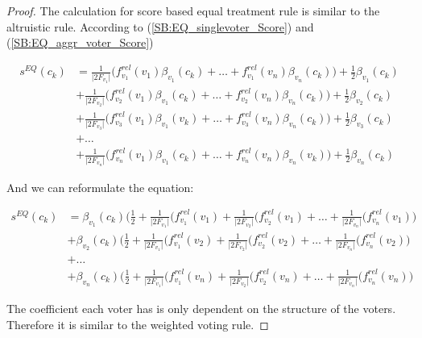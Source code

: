 \documentclass{article}
\begin{document}
\begin{proof}
    
The calculation for score based equal treatment rule is similar to the altruistic rule. According to   (\ref{SB:EQ_singlevoter_Score}) and    (\ref{SB:EQ_aggr_voter_Score})

\begin{equation*}
\begin{split}
s^{EQ}(c_k) &= \frac{1}{\vert 2F_{v_1}\vert}\big(f_{v_1}^{rel}(v_1)\beta_{v_1}(c_k) + \dots + f_{v_1}^{rel}(v_n)\beta_{v_n}(c_k)\big) + \frac{1}{2}\beta_{v_1}(c_k)\\
            &+ \frac{1}{\vert 2F_{v_2}\vert}\big(f_{v_2}^{rel}(v_1)\beta_{v_1}(c_k) + \dots + f_{v_2}^{rel}(v_n)\beta_{v_n}(c_k)\big) + \frac{1}{2}\beta_{v_2}(c_k) \\
            &+ \frac{1}{\vert 2F_{v_3}\vert}\big(f_{v_3}^{rel}(v_1)\beta_{v_1}(v_k) + \dots + f_{v_3}^{rel}(v_n)\beta_{v_n}(c_k)\big) + \frac{1}{2}\beta_{v_3}(c_k) \\
            &+ \dots \\ 
            &+ \frac{1}{\vert 2F_{v_n}\vert}\big(f_{v_n}^{rel}(v_1)\beta_{v_1}(c_k) + \dots + f_{v_n}^{rel}(v_n)\beta_{v_n}(v_k)\big) +    \frac{1}{2}\beta_{v_n}(c_k)
\end{split}
\end{equation*}

And we can reformulate the equation:

\begin{equation*}
\begin{split}
s^{EQ}(c_k) &= \beta_{v_1}(c_k)\big(\frac{1}{2}+\frac{1}{\vert 2F_{v_1}\vert}(f_{v_1}^{rel}(v_1) +  \frac{1}{\vert 2F_{v_2}\vert}(f_{v_2}^{rel}(v_1)+ \dots +\frac{1}{\vert 2F_{v_n}\vert}(f_{v_n}^{rel}(v_1)\big) \\
            &+ \beta_{v_2}(c_k)\big(\frac{1}{2}+\frac{1}{\vert 2F_{v_1}\vert}(f_{v_1}^{rel}(v_2) +  \frac{1}{\vert 2F_{v_2}\vert}(f_{v_2}^{rel}(v_2)+ \dots +\frac{1}{\vert 2F_{v_n}\vert}(f_{v_n}^{rel}(v_2)\big) \\
            &+  \dots  \\
            &+ \beta_{v_n}(c_k)\big(\frac{1}{2}+\frac{1}{\vert 2F_{v_1}\vert}(f_{v_1}^{rel}(v_n) +  \frac{1}{\vert 2F_{v_2}\vert}(f_{v_2}^{rel}(v_n)+ \dots +\frac{1}{\vert 2F_{v_n}\vert}(f_{v_n}^{rel}(v_n)\big) 
\end{split}
\end{equation*}

The coefficient each voter has is only dependent on the structure of the voters. Therefore it is similar to the weighted voting rule.
\end{proof}
\end{document}
